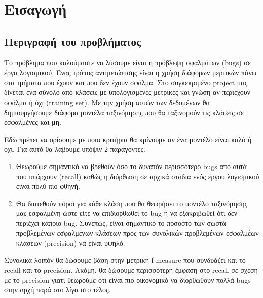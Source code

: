 \chapter{Εισαγωγή}
\section{Περιγραφή του προβλήματος}

Το πρόβλημα που καλούμαστε να λύσουμε είναι η πρόβλεψη σφαλμάτων (bugs) σε έργα λογισμικού.
Ένας τρόπος αντιμετώπισης είναι η χρήση διάφορων μερτικών πάνω στα τμήματα που έχουν και που δεν έχουν σφάλμα. Στο συγκεκριμένο project μας δίνεται ένα σύνολο από κλάσεις με υπολογισμένες μετρικές και γνώση αν περιέχουν σφάλμα ή όχι (training set). Με την χρήση αυτών των δεδομένων θα δημιουργήσουμε διάφορα μοντέλα ταξινόμησης που θα ταξινομούν τις κλάσεις σε εσφαλμένες και μη.

Εδώ πρέπει να ορίσουμε με ποια κριτήρια θα κρίνουμε αν ένα μοντέλο είναι καλό ή όχι. Για αυτό θα λάβουμε υπόψιν 2 παράγοντες.
\begin{enumerate}
\item Θεωρούμε σημαντικό να βρεθούν όσο το δυνατόν περισσότερο bugs από αυτά που υπάρχουν (recall) καθώς η διόρθωση σε αρχικά στάδια ενός έργου λογισμικού είναι πολύ πιο φθηνή.
\item Θα διατεθούν πόροι για κάθε κλάση που θα θεωρήσει το μοντέλο ταξινόμησης μας εσφαλμένη ώστε είτε να επιδιορθωθεί το bug ή να εξακριβωθεί ότι δεν περιέχει κάποιο bug. Συνεπώς, είναι σημαντικό το ποσοστό των  σωστά προβλεμένων εσφαλμένων κλάσεων προς των συνολικών προβλεμένων εσφαλμέων κλάσεων (precision) να είναι υψηλό.
\end{enumerate}

Συνολικά λοιπόν θα δώσουμε βάση στην μετρική f-measure που συνδυάζει και το recall και το precision. Ακόμη, θα δώσουμε περισσότερη έμφαση στο recall σε σχέση με το precision γιατί θεωρούμε ότι είναι πιο οικονομικό να διορθωθούν πολλά bugs στην αρχή παρά στο λίγα στο τέλος. 

